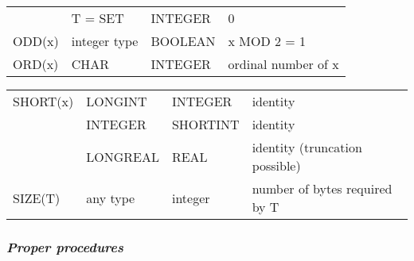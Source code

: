 \begin{flushleft}
\begin{tabular}{p{\FuncName}p{\FuncArg}p{\FuncRes}p{\FuncFun}}
         & T = SET           & INTEGER     & 0 \\
ODD(x)   & integer type      & BOOLEAN     & x MOD 2 = 1 \\
ORD(x)   & CHAR              & INTEGER     & ordinal number of x \\
\end{tabular}
\begin{tabular}{p{\FuncName}p{\FuncArg}p{\FuncRes}p{\FuncFun}}
SHORT(x) & LONGINT           & INTEGER     & identity             \\
         & INTEGER           & SHORTINT    & identity             \\
         & LONGREAL          & REAL        & identity (truncation possible) \\
SIZE(T)  & any type          & integer     & number of bytes required by T \\
\end{tabular}
\end{flushleft}

\subsubsection{\em Proper procedures}\label{o2r:std:proc}

